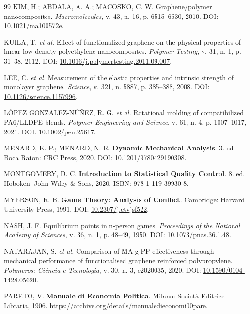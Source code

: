 \documentclass[12pt,a4paper,twoside]{article}
\begin{document}
\begin{thebibliography}{99}
KIM, H.; ABDALA, A. A.; MACOSKO, C. W. Graphene/polymer nanocomposites. \textit{Macromolecules}, v. 43, n. 16, p. 6515--6530, 2010. DOI: \href{https://doi.org/10.1021/ma100572e}{10.1021/ma100572e}.

KUILA, T. \textit{et al.} Effect of functionalized graphene on the physical properties of linear low density polyethylene nanocomposites. \textit{Polymer Testing}, v. 31, n. 1, p. 31--38, 2012. DOI: \href{https://doi.org/10.1016/j.polymertesting.2011.09.007}{10.1016/j.polymertesting.2011.09.007}.

LEE, C. \textit{et al.} Measurement of the elastic properties and intrinsic strength of monolayer graphene. \textit{Science}, v. 321, n. 5887, p. 385--388, 2008. DOI: \href{https://doi.org/10.1126/science.1157996}{10.1126/science.1157996}.

LÓPEZ GONZALEZ-NÚÑEZ, R. G. \textit{et al.} Rotational molding of compatibilized PA6/LLDPE blends. \textit{Polymer Engineering and Science}, v. 61, n. 4, p. 1007--1017, 2021. DOI: \href{https://doi.org/10.1002/pen.25617}{10.1002/pen.25617}.

MENARD, K. P.; MENARD, N. R. \textbf{Dynamic Mechanical Analysis}. 3. ed. Boca Raton: CRC Press, 2020. DOI: \href{https://doi.org/10.1201/9780429190308}{10.1201/9780429190308}.

MONTGOMERY, D. C. \textbf{Introduction to Statistical Quality Control}. 8. ed. Hoboken: John Wiley \& Sons, 2020. ISBN: 978-1-119-39930-8.

MYERSON, R. B. \textbf{Game Theory: Analysis of Conflict}. Cambridge: Harvard University Press, 1991. DOI: \href{https://doi.org/10.2307/j.ctvjsf522}{10.2307/j.ctvjsf522}.

NASH, J. F. Equilibrium points in n-person games. \textit{Proceedings of the National Academy of Sciences}, v. 36, n. 1, p. 48--49, 1950. DOI: \href{https://doi.org/10.1073/pnas.36.1.48}{10.1073/pnas.36.1.48}.

NATARAJAN, S. \textit{et al.} Comparison of MA-g-PP effectiveness through mechanical performance of functionalised graphene reinforced polypropylene. \textit{Polímeros: Ciência e Tecnologia}, v. 30, n. 3, e2020035, 2020. DOI: \href{https://doi.org/10.1590/0104-1428.05620}{10.1590/0104-1428.05620}.

PARETO, V. \textbf{Manuale di Economia Politica}. Milano: Società Editrice Libraria, 1906. \url{https://archive.org/details/manualedieconomi00pare}.


\end{thebibliography}
\end{document}
